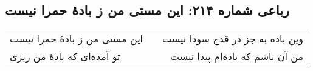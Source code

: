 \begin{center}
\section*{رباعی شماره ۲۱۴: این مستی من ز بادهٔ حمرا نیست}
\label{sec:0214}
\begin{longtable}{l p{0.5cm} r}
این مستی من ز بادهٔ حمرا نیست
&&
وین باده به جز در قدح سودا نیست
\\
تو آمده‌ای که بادهٔ من ریزی
&&
من آن باشم که باده‌ام پیدا نیست
\\
\end{longtable}
\end{center}
